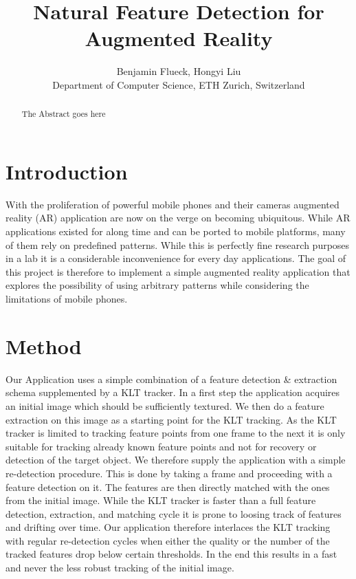 \documentclass[10pt,conference,compsocconf]{IEEEtran}
\begin{document}
\title{Natural Feature Detection for Augmented Reality}

\author{
  Benjamin Flueck, Hongyi Liu\\
  Department of Computer Science, ETH Zurich, Switzerland\\
}

\maketitle

\begin{abstract}
The Abstract goes here
\end{abstract}

\section{Introduction}

With the proliferation of powerful mobile phones and their cameras augmented reality (AR) application are now on the verge on becoming ubiquitous. While AR applications existed for along time and can be ported to mobile platforms, many of them rely on predefined patterns. While this is perfectly fine research purposes in a lab it is a considerable inconvenience for every day applications. The goal of this project is therefore to implement a simple augmented reality application that explores the possibility of using arbitrary patterns while considering the limitations of mobile phones.

\section{Method}

Our Application uses a simple combination of a feature detection & extraction schema supplemented by a KLT tracker. In a first step the application acquires an initial image which should be sufficiently textured. We then do a feature extraction on this image as a starting point for the KLT tracking. As the KLT tracker is limited to  tracking feature points from one frame to the next it is only suitable for tracking already known feature points and not for recovery or detection of the target object. We therefore supply the application with a simple re-detection procedure. This is done by taking a frame and proceeding with a feature detection on it. The features are then directly matched with the ones from the initial image. While the KLT tracker is faster than a full feature detection, extraction, and matching cycle it is prone to loosing track of features and drifting over time. Our application therefore interlaces the KLT tracking with regular re-detection cycles when either the quality or the number of the tracked features drop below certain thresholds. In the end this results in a fast and never the less robust tracking of the initial image.
\end{document}
